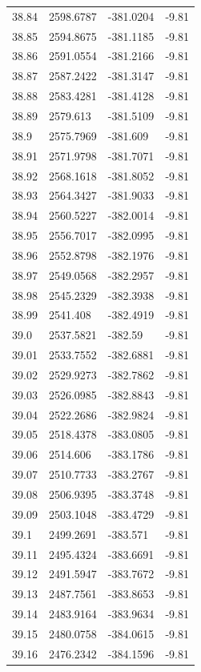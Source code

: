 \begin{table}[H]
\begin{tabular}{llll}
38.84 & 2598.6787 & -381.0204 & -9.81 \\
38.85 & 2594.8675 & -381.1185 & -9.81 \\
38.86 & 2591.0554 & -381.2166 & -9.81 \\
38.87 & 2587.2422 & -381.3147 & -9.81 \\
38.88 & 2583.4281 & -381.4128 & -9.81 \\
38.89 & 2579.613 & -381.5109 & -9.81 \\
38.9 & 2575.7969 & -381.609 & -9.81 \\
38.91 & 2571.9798 & -381.7071 & -9.81 \\
38.92 & 2568.1618 & -381.8052 & -9.81 \\
38.93 & 2564.3427 & -381.9033 & -9.81 \\
38.94 & 2560.5227 & -382.0014 & -9.81 \\
38.95 & 2556.7017 & -382.0995 & -9.81 \\
38.96 & 2552.8798 & -382.1976 & -9.81 \\
38.97 & 2549.0568 & -382.2957 & -9.81 \\
38.98 & 2545.2329 & -382.3938 & -9.81 \\
38.99 & 2541.408 & -382.4919 & -9.81 \\
39.0 & 2537.5821 & -382.59 & -9.81 \\
39.01 & 2533.7552 & -382.6881 & -9.81 \\
39.02 & 2529.9273 & -382.7862 & -9.81 \\
39.03 & 2526.0985 & -382.8843 & -9.81 \\
39.04 & 2522.2686 & -382.9824 & -9.81 \\
39.05 & 2518.4378 & -383.0805 & -9.81 \\
39.06 & 2514.606 & -383.1786 & -9.81 \\
39.07 & 2510.7733 & -383.2767 & -9.81 \\
39.08 & 2506.9395 & -383.3748 & -9.81 \\
39.09 & 2503.1048 & -383.4729 & -9.81 \\
39.1 & 2499.2691 & -383.571 & -9.81 \\
39.11 & 2495.4324 & -383.6691 & -9.81 \\
39.12 & 2491.5947 & -383.7672 & -9.81 \\
39.13 & 2487.7561 & -383.8653 & -9.81 \\
39.14 & 2483.9164 & -383.9634 & -9.81 \\
39.15 & 2480.0758 & -384.0615 & -9.81 \\
39.16 & 2476.2342 & -384.1596 & -9.81 \\

\end{tabular}
\end{table}
